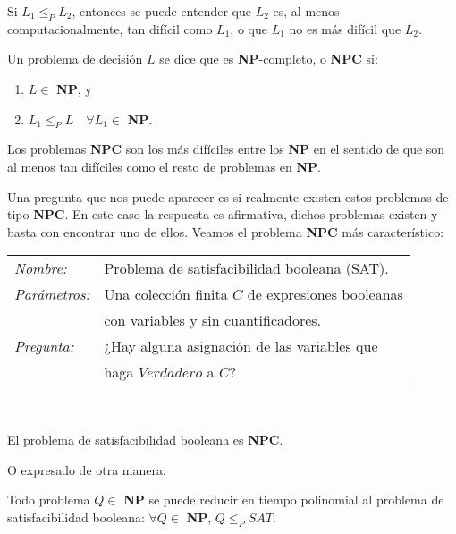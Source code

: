 Si $L_1 \leq_P L_2$, entonces se puede entender que $L_2$ es, al menos
computacionalmente, tan difícil como $L_1$, o que $L_1$ no es más difícil que $L_2$.

\begin{definition}
	Un problema de decisión $L$ se dice que es \textbf{NP}-completo, o \textbf{NPC} si:
	\begin{enumerate}[label=(\roman*)]
		\item $L \in $ \textbf{NP}, y
		\item $L_1 \leq_P L \quad \forall L_1 \in $ \textbf{NP}.
	\end{enumerate}
\end{definition}

\hfil

Los problemas \textbf{NPC} son los más difíciles entre los \textbf{NP}
en el sentido de que son al menos tan difíciles como el resto de
problemas en \textbf{NP}.

Una pregunta que nos puede aparecer es si realmente existen estos problemas de
tipo \textbf{NPC}. En este caso la respuesta es afirmativa, dichos problemas
existen y basta con encontrar uno de ellos.
Veamos el problema \textbf{NPC} más característico:

\begin{tabular}{|ll}
	\textit{Nombre:} & Problema de satisfacibilidad booleana (SAT). \\
	\textit{Parámetros:} & Una colección finita $C$ de expresiones booleanas \\
	&  con variables y sin cuantificadores. \\
	\textit{Pregunta:} & ¿Hay alguna asignación de las variables que \\ & haga $Verdadero$ a $C$? \\
\end{tabular}
\\

\begin{theorem}
	El problema de satisfacibilidad booleana es \textbf{NPC}.
\end{theorem}

O expresado de otra manera:

\begin{theorem}
	\label{redNPC:theo}
	Todo problema $Q \in $ \textbf{NP} se puede reducir en tiempo polinomial al problema de satisfacibilidad booleana: $\forall Q \in $ \textbf{NP}, $Q \leq_P SAT$.
\end{theorem}


